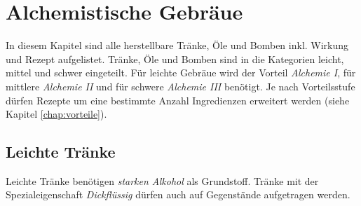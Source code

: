 {\let\clearpage\relax\chapter{Alchemistische Gebräue}}
\label{chap:alchemistische_gebraeue}
In diesem Kapitel sind alle herstellbare Tränke, Öle und Bomben inkl. Wirkung und Rezept aufgelistet. Tränke, Öle und Bomben sind in die Kategorien leicht, mittel und schwer eingeteilt. Für leichte Gebräue wird der Vorteil \textit{Alchemie I}, für mittlere \textit{Alchemie II} und für schwere \textit{Alchemie III} benötigt. Je nach Vorteilsstufe dürfen Rezepte um eine bestimmte Anzahl Ingredienzen erweitert werden (siehe Kapitel \ref{chap:vorteile}).

\section{Leichte Tränke}
Leichte Tränke benötigen \textit{starken Alkohol} als Grundstoff. Tränke mit der Spezialeigenschaft \textit{Dickflüssig} dürfen auch auf Gegenstände aufgetragen werden.

